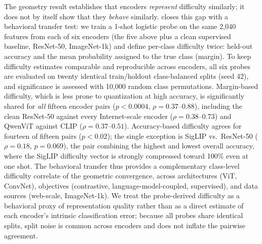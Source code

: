 \documentclass[a4paper,fleqn]{cas-sc}
\begin{document}
The geometry result establishes that encoders \emph{represent} difficulty similarly; it does not by itself show that they \emph{behave} similarly.  closes this gap with a behavioral transfer test: we train a 1-shot logistic probe on the same 2{,}040 features from each of six encoders (the five above plus a clean supervised baseline, ResNet-50, ImageNet-1k) and define per-class difficulty twice: held-out accuracy and the mean probability assigned to the true class (margin). To keep difficulty estimates comparable and reproducible across encoders, all six probes are evaluated on twenty identical train/holdout class-balanced splits (seed 42), and significance is assessed with 10{,}000 random class permutations. Margin-based difficulty, which is less prone to quantization at high accuracy, is significantly shared for \emph{all} fifteen encoder pairs ($p<0.0004$, $\rho=0.37$--$0.88$), including the clean ResNet-50 against every Internet-scale encoder ($\rho=0.38$--$0.73$) and QwenViT against CLIP ($\rho=0.37$--$0.51$). Accuracy-based difficulty agrees for fourteen of fifteen pairs ($p<0.02$); the single exception is SigLIP vs.\ ResNet-50 ($\rho=0.18$, $p=0.069$), the pair combining the highest and lowest overall accuracy, where the SigLIP difficulty vector is strongly compressed toward 100\% even at one shot. The behavioral transfer thus provides a complementary class-level difficulty correlate of the geometric convergence, across architectures (ViT, ConvNet), objectives (contrastive, language-model-coupled, supervised), and data sources (web-scale, ImageNet-1k). We treat the probe-derived difficulty as a behavioral proxy of representation quality rather than as a direct estimate of each encoder's intrinsic classification error; because all probes share identical splits, split noise is common across encoders and does not inflate the pairwise agreement.
\end{document}
